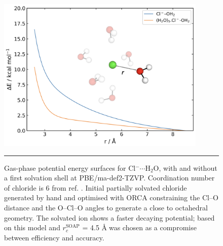 \documentclass[../../main.tex]{subfiles}
\begin{document}
\begin{figure}[h!]
	\vspace{0.4cm}
	\centering
	\includegraphics[width=10cm]{6/gap/figs_si/fig24}
	\vspace{0.2cm}
	\hrule
	\caption{Gas-phase potential energy surfaces for Cl${}^{-}\cdots$H$_{2}$O, with and without a first solvation shell at PBE/ma-def2-TZVP. Coordination number of chloride is 6 from ref. \cite{Busch2013}. Initial partially solvated chloride generated by hand and optimised with ORCA constraining the Cl--O distance and the O--Cl--O angles to generate a close to octahedral geometry. The solvated ion shows a faster decaying potential; based on this model and $r_c^\text{SOAP}$ = 4.5 \AA$\;$was chosen as a compromise between efficiency and accuracy.}
	\label{fig::ml_si_24}
\end{figure}
\end{document}

